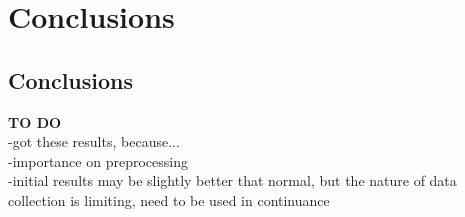 
\section{Conclusions}\label{sec:conclusion}








\subsection{Conclusions}
\textbf{TO DO}\\
-got these results, because...\\
-importance on preprocessing\\
-initial results may be slightly better that normal, but the nature of data collection is limiting, need to be used in continuance\\ 

